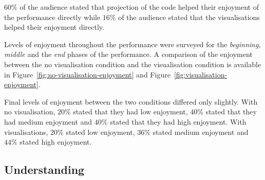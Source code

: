$60\%$ of the audience stated that projection of the code helped their enjoyment of the performance directly while $16\%$ of the audience stated that the visualisations helped their enjoyment directly.

Levels of enjoyment throughout the performance were surveyed for the \emph{beginning}, \emph{middle} and the \emph{end} phases of the performance. A comparison of the enjoyment between the no visualisation condition and the visualisation condition is available in Figure~\ref{fig:no-visualisation-enjoyment} and Figure~\ref{fig:visualisation-enjoyment}.

Final levels of enjoyment between the two conditions differed only slightly. With no visualisation, $20\%$ stated that they had low enjoyment, $40\%$ stated that they had medium enjoyment and $40\%$ stated that they had high enjoyment. With visualisations, $20\%$ stated low enjoyment, $36\%$ stated medium enjoyment and $44\%$ stated high enjoyment.

\subsection{Understanding}

